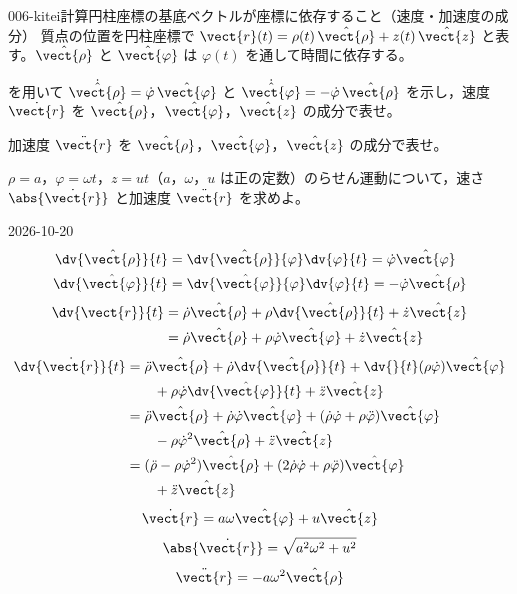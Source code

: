 \documentclass[uplatex,dvipdfmx,a4paper,11pt]{jsarticle}
\begin{document}
\begin{mondai}{006-kitei}{計算}{円柱座標の基底ベクトルが座標に依存すること（速度・加速度の成分）}
質点の位置を円柱座標で $\vect{r}(t) = \rho(t)\,\hat{\vect{\rho}} + z(t)\,\hat{\vect{z}}$ と表す。$\hat{\vect{\rho}}$ と $\hat{\vect{\varphi}}$ は $\varphi(t)$ を通して時間に依存する。
  \begin{shoumon}
    \item {} を用いて $\dot{\hat{\vect{\rho}}} = \dot{\varphi}\,\hat{\vect{\varphi}}$ と $\dot{\hat{\vect{\varphi}}} = -\dot{\varphi}\,\hat{\vect{\rho}}$ を示し，速度 $\dot{\vect{r}}$ を $\hat{\vect{\rho}}$，$\hat{\vect{\varphi}}$，$\hat{\vect{z}}$ の成分で表せ。
    \item 加速度 $\ddot{\vect{r}}$ を $\hat{\vect{\rho}}$，$\hat{\vect{\varphi}}$，$\hat{\vect{z}}$ の成分で表せ。
    \item $\rho = a$，$\varphi = \omega t$，$z = ut$（$a$，$\omega$，$u$ は正の定数）のらせん運動について，速さ $\abs{\dot{\vect{r}}}$ と加速度 $\ddot{\vect{r}}$ を求めよ。
  \end{shoumon}
\begin{kotaeutsushi}{2026-10-20}
\begin{align*}
\dv{\hat{\vect{\rho}}}{t}&=\dv{\hat{\vect{\rho}}}{\varphi}\dv{\varphi}{t}=\dot{\varphi}\hat{\vect{\varphi}}\\
\dv{\hat{\vect{\varphi}}}{t}&=\dv{\hat{\vect{\varphi}}}{\varphi}\dv{\varphi}{t}=-\dot{\varphi}\hat{\vect{\rho}}
\end{align*}
\begin{align*}
\dv{\vect{r}}{t}&=\dot{\rho}\hat{\vect{\rho}}+\rho\dv{\hat{\vect{\rho}}}{t}+\dot{z}\hat{\vect{z}}\\
&=\dot{\rho}\hat{\vect{\rho}}+\rho\dot{\varphi}\hat{\vect{\varphi}}+\dot{z}\hat{\vect{z}}
\end{align*}
\begin{align*}
\dv{\dot{\vect{r}}}{t}&=\ddot{\rho}\hat{\vect{\rho}}+\dot{\rho}\dv{\hat{\vect{\rho}}}{t}+\dv{}{t}(\rho\dot{\varphi})\hat{\vect{\varphi}}\\
&\qquad+\rho\dot{\varphi}\dv{\hat{\vect{\varphi}}}{t}+\ddot{z}\hat{\vect{z}}\\
&=\ddot{\rho}\hat{\vect{\rho}}+\dot{\rho}\dot{\varphi}\hat{\vect{\varphi}}+(\dot{\rho}\dot{\varphi}+\rho\ddot{\varphi})\hat{\vect{\varphi}}\\
&\qquad-\rho\dot{\varphi}^{2}\hat{\vect{\rho}}+\ddot{z}\hat{\vect{z}}\\
&=(\ddot{\rho}-\rho\dot{\varphi}^{2})\hat{\vect{\rho}}+(2\dot{\rho}\dot{\varphi}+\rho\ddot{\varphi})\hat{\vect{\varphi}}\\
&\qquad+\ddot{z}\hat{\vect{z}}
\end{align*}
\[ \dot{\vect{r}}=a\omega\hat{\vect{\varphi}}+u\hat{\vect{z}} \]
\[ \abs{\dot{\vect{r}}}=\sqrt{a^{2}\omega^{2}+u^{2}} \]
\[ \ddot{\vect{r}}=-a\omega^{2}\hat{\vect{\rho}} \]
\end{kotaeutsushi}
\end{mondai}
\end{document}
